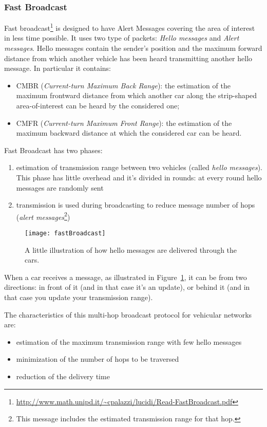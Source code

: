 \subsubsection{Fast Broadcast}
Fast broadcast\footnote{\url{http://www.math.unipd.it/~cpalazzi/lucidi/Read-FastBroadcast.pdf}} 
is designed to have Alert Messages covering the area of interest
in less time possible. It uses two type of packets: \textit{Hello messages} and
\textit{Alert messages}. Hello messages contain the sender's position and the
maximum forward distance from which another vehicle has been heard transmitting
another hello message. In particular it contains:
\begin{itemize}
  \item CMBR (\textit{Current-turn Maximum Back Range}): the estimation of the 
  maximum frontward distance from which another car along the strip-shaped 
  area-of-interest can be heard by the considered one;
  \item CMFR (\textit{Current-turn Maximum Front Range}): the estimation of the
  maximum backward distance at which the considered car can be heard.
\end{itemize}

Fast Broadcast has two phases:
\begin{enumerate}
\item estimation of transmission range between two vehicles (called
  \textit{hello messages}). This phase has little overhead and it's divided in
  rounds: at every round
  hello messages are randomly sent
\item transmission is used during broadcasting to reduce message number of hops
  (\textit{alert messages}\footnote{This message includes the estimated
  transmission range for that hop.})
\end{enumerate}

\begin{figure}
  \centering
  \texttt{[image: fastBroadcast]}
  \caption[Hello Message propagation]{A little illustration of how hello
    messages are delivered through the cars.}
  \label{fig:802.11ws:helloMessageDelivery}
\end{figure}

When a car receives a message, as illustrated in
Figure~\ref{fig:802.11ws:helloMessageDelivery}, it can be from two directions:
in front of it (and in that case it's an update), or behind it (and in that case
you update your transmission range).

The characteristics of this multi-hop broadcast protocol for vehicular networks
are:
\begin{itemize}
\item estimation of the maximum transmission range with few hello messages
\item minimization of the number of hops to be traversed
\item reduction of the delivery time
\end{itemize}

